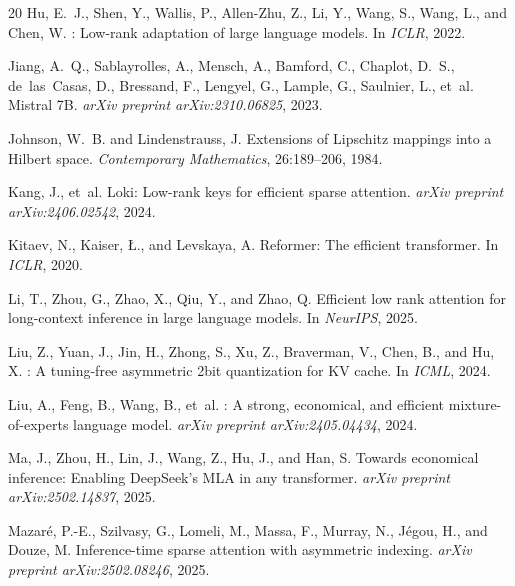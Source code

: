 \documentclass{article} %
\begin{document}
\begin{thebibliography}{20}
Hu, E.~J., Shen, Y., Wallis, P., Allen-Zhu, Z., Li, Y., Wang, S., Wang, L., and Chen, W.
: Low-rank adaptation of large language models.
\newblock In \emph{ICLR}, 2022.

Jiang, A.~Q., Sablayrolles, A., Mensch, A., Bamford, C., Chaplot, D.~S., de~las~Casas, D., Bressand, F., Lengyel, G., Lample, G., Saulnier, L., et~al.
\newblock Mistral 7B.
\newblock \emph{arXiv preprint arXiv:2310.06825}, 2023.

Johnson, W.~B. and Lindenstrauss, J.
\newblock Extensions of {L}ipschitz mappings into a {H}ilbert space.
\newblock \emph{Contemporary Mathematics}, 26:189--206, 1984.

Kang, J., et~al.
\newblock Loki: Low-rank keys for efficient sparse attention.
\newblock \emph{arXiv preprint arXiv:2406.02542}, 2024.

Kitaev, N., Kaiser, {\L}., and Levskaya, A.
\newblock Reformer: The efficient transformer.
\newblock In \emph{ICLR}, 2020.

Li, T., Zhou, G., Zhao, X., Qiu, Y., and Zhao, Q.
\newblock Efficient low rank attention for long-context inference in large language models.
\newblock In \emph{NeurIPS}, 2025.

Liu, Z., Yuan, J., Jin, H., Zhong, S., Xu, Z., Braverman, V., Chen, B., and Hu, X.
: A tuning-free asymmetric 2bit quantization for {KV} cache.
\newblock In \emph{ICML}, 2024.

Liu, A., Feng, B., Wang, B., et~al.
: A strong, economical, and efficient mixture-of-experts language model.
\newblock \emph{arXiv preprint arXiv:2405.04434}, 2024.

Ma, J., Zhou, H., Lin, J., Wang, Z., Hu, J., and Han, S.
\newblock Towards economical inference: Enabling {DeepSeek}'s {MLA} in any transformer.
\newblock \emph{arXiv preprint arXiv:2502.14837}, 2025.

Mazar{\'e}, P.-E., Szilvasy, G., Lomeli, M., Massa, F., Murray, N., J{\'e}gou, H., and Douze, M.
\newblock Inference-time sparse attention with asymmetric indexing.
\newblock \emph{arXiv preprint arXiv:2502.08246}, 2025.


\end{thebibliography}
\end{document}
